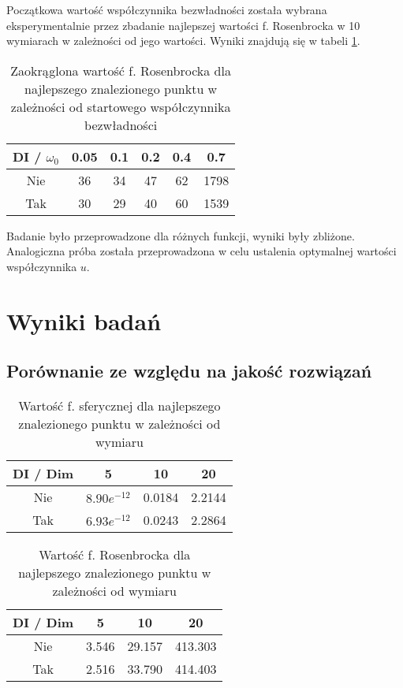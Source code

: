 \documentclass[12pt]{article}
\begin{document}
Początkowa wartość współczynnika bezwładności została wybrana eksperymentalnie przez zbadanie najlepszej wartości f. Rosenbrocka w 10 wymiarach w zależności od
jego wartości. Wyniki znajdują się w tabeli \ref{tab:test_rosenbrock}.

\begin{table}[h]
	\centering
	\begin{tabular}{|c|c|c|c|c|c|}
		\hline
		DI / $\omega_0$ & 0.05 & 0.1 & 0.2 & 0.4 & 0.7  \\
		\hline
		Nie             & 36   & 34  & 47  & 62  & 1798 \\
		Tak             & 30   & 29  & 40  & 60  & 1539 \\
		\hline
	\end{tabular}
	\caption{Zaokrąglona wartość f. Rosenbrocka dla najlepszego znalezionego punktu w zależności od startowego współczynnika bezwładności}
	\label{tab:test_rosenbrock}
\end{table}


Badanie było przeprowadzone dla różnych funkcji, wyniki były zbliżone.
Analogiczna próba została przeprowadzona w celu ustalenia optymalnej wartości współczynnika $u$.


\pagebreak
\section{Wyniki badań}
\subsection*{Porównanie ze względu na jakość rozwiązań}

\begin{table}[ht]
	\centering
	\begin{tabular}{|c|c|c|c|}
		\hline
		DI  / Dim & 5             & 10     & 20     \\
		\hline
		Nie       & $8.90e^{-12}$ & 0.0184 & 2.2144 \\
		Tak       & $6.93e^{-12}$ & 0.0243 & 2.2864 \\
		\hline
	\end{tabular}
	\caption{Wartość f. sferycznej dla najlepszego znalezionego punktu w zależności od wymiaru}
	\label{tab:sphere_values}
\end{table}

\begin{table}[ht]
	\centering
	\begin{tabular}{|c|c|c|c|}
		\hline
		DI / Dim & 5     & 10     & 20      \\
		\hline
		Nie      & 3.546 & 29.157 & 413.303 \\
		Tak      & 2.516 & 33.790 & 414.403 \\
		\hline
	\end{tabular}
	\caption{Wartość f. Rosenbrocka dla najlepszego znalezionego punktu w zależności od wymiaru}
	\label{tab:rosenbrock_values}
\end{table}
\end{document}
